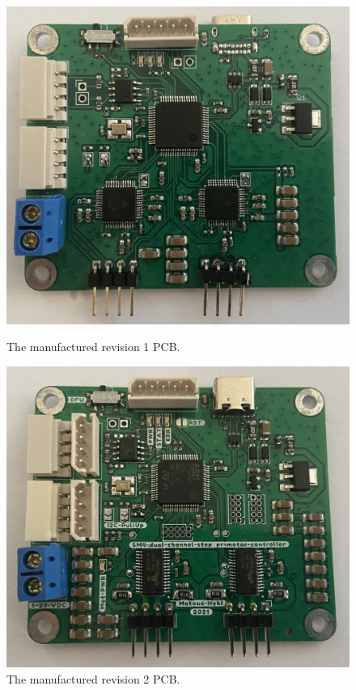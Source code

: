 \begin{figure}[H]
    \begin{minipage}[t]{0.45\textwidth}
        \centering
        \includegraphics[height=0.9\textwidth]{obrazky/rev1}
        \caption{The manufactured revision 1 PCB.}
        \label{fig:rev1_pcb}
    \end{minipage}\hfill
    \begin{minipage}[t]{0.45\textwidth}
        \centering
        \includegraphics[height=0.9\textwidth]{obrazky/rev2}
        \caption{The manufactured revision 2 PCB.}
        \label{fig:rev2_pcb}
    \end{minipage}
\end{figure}

